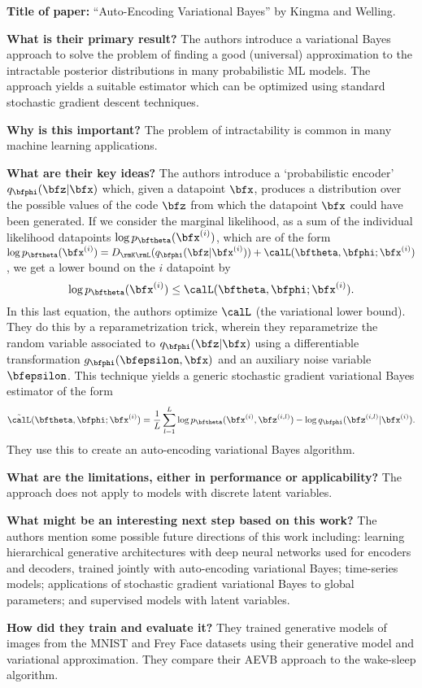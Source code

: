 \noindent \textbf{Title of paper:} ``Auto-Encoding Variational Bayes'' by Kingma and Welling. 

\noindent\textbf{What is their primary result?} The authors introduce a
variational Bayes approach to solve the problem of finding a good (universal)
approximation to the intractable posterior distributions in many probabilistic
ML models. The approach yields a suitable estimator which can be optimized using
standard stochastic gradient descent techniques.

\noindent\textbf{Why is this important?} The problem of intractability is common
in many machine learning applications.

\noindent\textbf{What are their key ideas?} The authors introduce a
`probabilistic encoder' $q_\bfphi(\bfz|\bfx)$ which, given a datapoint $\bfx$,
produces a distribution over the possible values of the code $\bfz$ from which
the datapoint $\bfx$ could have been generated. If we consider the marginal
likelihood, as a sum of the individual likelihood datapoints $\log
p_{\bftheta}(\bfx^{(i)})$, which are of the form $\log
p_{\bftheta}(\bfx^{(i)})=D_{\rmK\rmL}(q_{\bfphi}(\bfz|\bfx^{(i)}))+\calL(\bftheta,\bfphi;\bfx^{(i)})$,
we get a lower bound on the $i$ datapoint by
\[
  \log p_{\bftheta}(\bfx^{(i)})\leq\calL(\bftheta,\bfphi;\bfx^{(i)}).
\]
In this last equation, the authors optimize $\calL$ (the variational lower
bound). They do this by a reparametrization trick, wherein they reparametrize
the random variable associated to $q_{\bfphi}(\bfz|\bfx)$ using a differentiable
transformation $g_{\bfphi}(\bfepsilon,\bfx)$ and an auxiliary noise variable
$\bfepsilon$. This technique yields a generic stochastic gradient variational
Bayes estimator of the form
\[
  \tilde \calL(\bftheta,\bfphi;\bfx^{(i)})=\frac 1L\sum_{l=1}^L \log
  p_{\bftheta}(\bfx^{(i)},\bfz^{(i,l)})-\log q_{\bfphi}(\bfz^{(i,l)}|\bfx^{(i)}).
\]
They use this to create an auto-encoding variational Bayes algorithm.

\noindent\textbf{What are the limitations, either in performance or
  applicability?} The approach does not apply to models with discrete latent
variables.

\noindent\textbf{What might be an interesting next step based on this work?} The
authors mention some possible future directions of this work including: learning
hierarchical generative architectures with deep neural networks used for
encoders and decoders, trained jointly with auto-encoding variational Bayes;
time-series models; applications of stochastic gradient variational Bayes to
global parameters; and supervised models with latent variables.


\noindent\textbf{How did they train and evaluate it?} They trained generative
models of images from the MNIST and Frey Face datasets using their generative
model and variational approximation. They compare their AEVB approach to the
wake-sleep algorithm.



